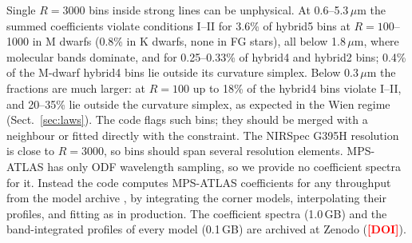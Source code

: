 \documentclass{aa}
\newcommand{\tbd}[1]{\textcolor{red}{\textbf{[#1]}}}
\begin{document}
Single $R=3000$ bins inside strong lines can be unphysical. At
0.6--5.3\,$\mu$m the summed coefficients violate conditions I--II for 3.6\% of
hybrid5 bins at $R=100$--1000 in M dwarfs (0.8\% in K dwarfs, none in FG
stars), all below 1.8\,$\mu$m, where molecular bands dominate, and for
0.25--0.33\% of hybrid4 and hybrid2 bins; 0.4\% of the M-dwarf hybrid4 bins
lie outside its curvature simplex. Below 0.3\,$\mu$m the fractions are much
larger: at $R=100$ up to 18\% of the hybrid4 bins violate I--II, and 20--35\%
lie outside the curvature simplex, as expected in the Wien regime
(Sect.~\ref{sec:laws}). The code flags such bins; they should be merged with a
neighbour or fitted directly with the constraint. The NIRSpec G395H resolution is
close to $R=3000$, so bins should span several resolution elements. MPS-ATLAS
has only ODF wavelength sampling, so we provide no coefficient spectra for it.
Instead the code computes MPS-ATLAS coefficients for any throughput from the
model archive \citep[about 9.5\,GB per set;][]{kostogryz2022}, by integrating
the corner models, interpolating their profiles, and fitting as in
production. The coefficient spectra (1.0\,GB) and the band-integrated profiles
of every model (0.1\,GB) are archived at Zenodo (\tbd{DOI}).
\end{document}

